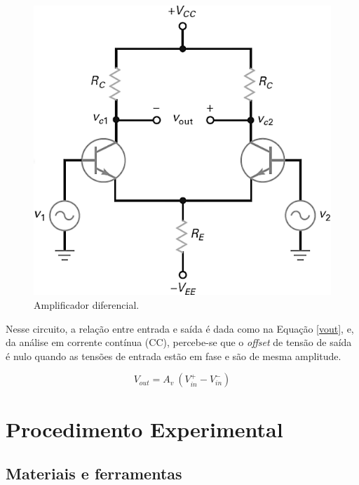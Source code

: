 \documentclass[a4paper,12pt,oneside,openany,table,xcdraw]{article}
\begin{document}
\vspace{0.2cm}
\begin{figure}[H]
\centering
\includegraphics[width=12cm]{amp-dif}
\caption{Amplificador diferencial.}
\label{intro:amp-dif}
\end{figure}
\vspace{0.3cm}

Nesse circuito, a relação entre entrada e saída é dada como na Equação \ref{vout}, e, da análise em corrente contínua (CC), percebe-se que o \emph{offset} de tensão de saída é nulo quando as tensões de entrada estão em fase e são de mesma amplitude.

\begin{equation} \label{vout}
V_{out} = A_v\ (V_{in} ^+ - V_{in} ^-)
\end{equation}


\section{Procedimento Experimental}
\subsection{Materiais e ferramentas} %
\end{document}
